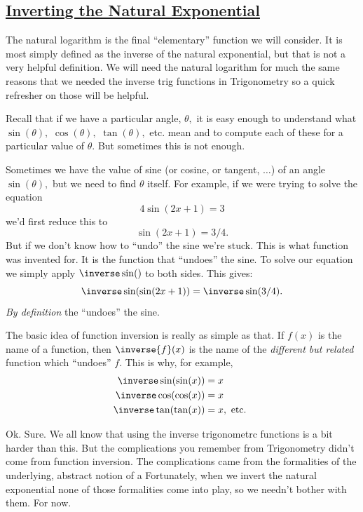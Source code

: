 \subsection*{\underline{Inverting the Natural Exponential}}
\label{sec:underl-logar-as}
The natural logarithm is the final ``elementary'' function we will
consider.  It is most simply defined as the inverse of the natural
exponential, but that is not a very helpful definition.  We will need
the natural logarithm for much the same reasons that we needed the
inverse trig functions in Trigonometry so a quick refresher on those
will be helpful.


Recall that if we have a particular angle, $\theta,$ it is easy enough
to understand what $\sin(\theta),$ $\cos(\theta),$ $\tan(\theta),$
etc. mean and to compute each of these for a particular value of
$\theta$. But sometimes this is not enough.

Sometimes we have the value of sine (or cosine, or tangent, $\ldots$)
of an angle $\sin(\theta),$ but we need to find $\theta$ itself. For
example, if we were trying to solve the equation
$$
4\sin(2x+1)=3
$$
we'd first reduce this to
$$
\sin(2x+1)=3/4.
$$
But if we don't know how to ``undo'' the sine we're stuck. This is
what   function was invented for. It is
the function that ``undoes'' the sine. To solve our equation we simply
apply $\inverse\sin()$ to both sides. This gives:
$$
\inverse\sin(\sin(2x+1))=\inverse\sin(3/4).
$$
\emph{By definition} the  ``undoes'' the sine. 

The basic idea of \alert{function inversion} is really as simple as
that. If $f(x)$ is the name of a function, then $\inverse{f}(x)$ is
the name of the \emph{different but related} function which ``undoes''
$f.$ This is why, for example,
\begin{align*}
  \inverse\sin(\sin(x))&=x \\
  \inverse\cos(\cos(x))&=x \\
  \inverse\tan(\tan(x))&=x, \text{ etc. }
\end{align*}

Ok. Sure. We all know that using the inverse trigonometrc functions is
a bit harder than this. But the complications you remember from
Trigonometry didn't come from function inversion. The complications
came from the formalities of the underlying, abstract notion of a
  Fortunately, when we invert the natural exponential
none of those formalities come into play, so we needn't bother with
them. For now.

